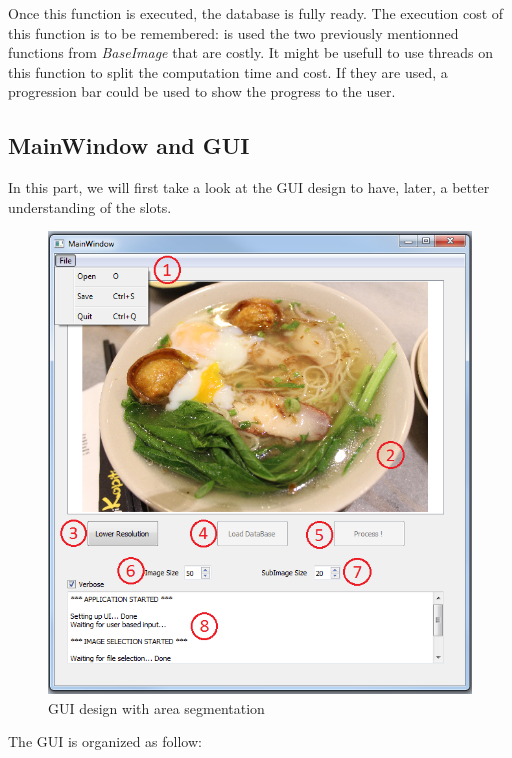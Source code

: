 \documentclass[aps,letterpaper,11pt]{revtex4}
\begin{document}
Once this function is executed, the database is fully ready.
The execution cost of this function is to be remembered: is used the two previously mentionned functions from \textit{BaseImage} that are costly. It might be usefull to use threads on this function to split the computation time and cost. If they are used, a progression bar could be used to show the progress to the user.

\subsection{MainWindow and GUI}
In this part, we will first take a look at the GUI design to have, later, a better understanding of the slots.

\begin{figure}[H]
	\centering
	\includegraphics[width=15cm]{global_numbers.png}
	\caption{GUI design with area segmentation}
	\label{fig: GlobalDesignNumbers}    
\end{figure}

The GUI is organized as follow:
\end{document}
